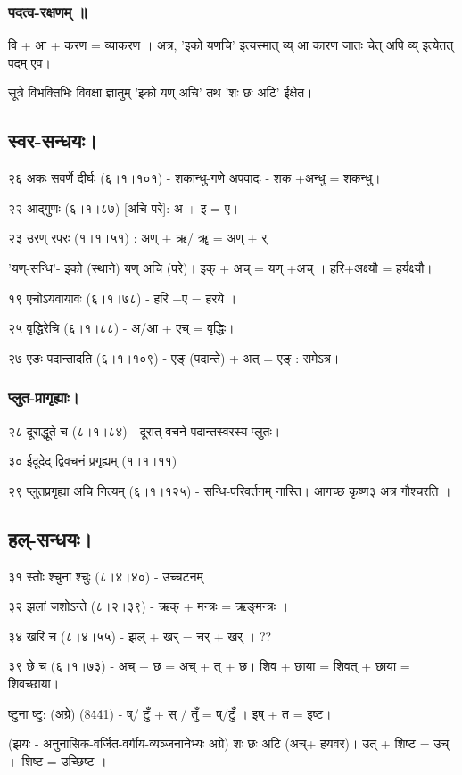 \documentclass[oneside, article]{memoir}
\begin{document}
\subsubsection{पदत्व-रक्षणम् ॥}
वि + आ + करण = व्याकरण । अत्र, 'इको यणचि' इत्यस्मात् व्य् आ कारण जातः चेत् अपि व्य् इत्येतत् पदम् एव।

सूत्रे विभक्तिभिः विवक्षा ज्ञातुम् 'इको यण् अचि' तथ 'शः छः अटि' ईक्षेत।

\subsection{स्वर-सन्धयः।}
२६ अकः सवर्णे दीर्घः (६।१।१०१)  - शकान्धु-गणे अपवादः - शक +‌अन्धु = शकन्धु।

२२ आद्गुणः (६।१।८७) [अचि परे]: अ + इ = ए।

२३ उरण् रपरः (१।१।५१) : अण् + ऋ/ ॠ = अण् + र्
 
'यण्-सन्धि'- इको (स्थाने) यण् अचि (परे)। इक् + अच् = यण् +‌अच् । हरि+अक्ष्यौ = हर्यक्ष्यौ।

१९ एचोऽयवायावः (६।१।७८) - हरि +‌ए = हरये ।

२५ वृद्धिरेचि (६।१।८८) - अ/आ + एच् = वृद्धिः।

२७ एङः पदान्तादति (६।१।१०९) - एङ् (पदान्ते) + अत् = एङ् : रामेऽत्र।

\subsubsection{प्लुत-प्रागृह्याः।}
२८ दूराद्धूते च (८।१।८४) - दूरात् वचने पदान्तस्वरस्य प्लुतः।

३० ईदूदेद् द्विवचनं प्रगृह्यम् (१।१।११)

२९ प्लुतप्रगृह्या अचि नित्यम् (६।१।१२५) - सन्धि-परिवर्तनम् नास्ति। आगच्छ कृष्ण३ अत्र गौश्चरति ।

\subsection{हल्-सन्धयः।}
३१ स्तोः श्चुना श्चुः (८।४।४०) - उच्चटनम्

३२ झलां जशोऽन्ते (८।२।३९) - ऋक् + मन्त्रः = ऋङ्मन्त्रः ।

३४ खरि च (८।४।५५) - झल् + खर् = चर् + खर् । ??

३९ छे च (६।१।७३)  - अच् + छ = अच् + त् + छ। शिव + छाया = शिवत् + छाया = शिवच्छाया।

ष्टुना ष्टु: (अग्रे) (8\.4\.41) - ष्/ टुँ + स् / तुँ = ष्/टुँ । इष् + त = इष्ट।

(झयः - अनुनासिक-वर्जित-वर्गीय-व्यञ्जनानेभ्यः अग्रे) शः छः अटि (अच्+ हयवर)। उत् + शिष्ट = उच् + शिष्ट = उच्छिष्ट ।
\end{document}
